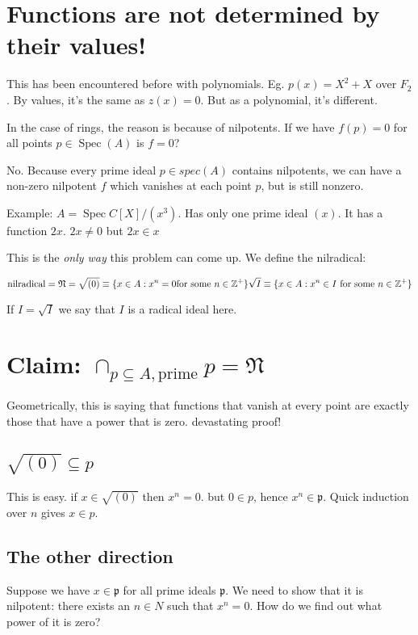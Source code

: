 \documentclass{book}
\newcommand{\Z}{\ensuremath{\mathbb{Z}}}
\newcommand{\spec}{\operatorname{Spec}}
\newcommand{\p}{\mathfrak{p}}
\theoremstyle{definition}
\begin{document}
\section{Functions are not determined by their values!}

This has been encountered before with
polynomials. Eg. $p(x) = X^2 + X$ over $F_2$. By values, it's the same
as $z(x) = 0$. But as a polynomial, it's different.

In the case of rings, the reason is because of nilpotents. If we have
$f(p) = 0$ for all points $p \in \spec(A)$ is $f = 0$? 

No. Because every prime ideal $p \in spec(A)$ contains nilpotents,
we can have a non-zero nilpotent $f$ which vanishes at each point $p$,
but is still nonzero.

Example: $A = \spec C[X]/(x^3)$. Has only one prime ideal $(x)$. It has 
a function $2x$. $2x \neq 0$ but $2x \in x$

This is the \emph{only way} this problem can come up. We define
the nilradical:

$$
\text{nilradical} = \mathfrak N = \sqrt{(0)} \equiv \{ x \in A : x^n = 0 \text{for some } n \in \Z^+ \} \\
\sqrt{I} \equiv \{ x \in A : x^n \in I \text{ for some } n \in \Z^+ \}
$$

If $I = \sqrt{I}$ we say that $I$ is a radical ideal here.


\section{Claim: $\cap_{p \subseteq A, \text{prime}} p = \mathfrak N$}
Geometrically, this is saying that functions that vanish at every point
are exactly those that have a power that is zero.  devastating proof!

\subsection{$\sqrt{(0)} \subseteq p$} This is easy. if $x \in \sqrt{(0)}$
then $x^n = 0$. but $0 \in p$, hence $x^n \in \p$. Quick induction over
$n$ gives $x \in p$.

\subsection{The other direction}
Suppose we have $x \in \p$ for all prime ideals $\p$. We need
to show that it is nilpotent: there exists an $n \in N$ such that $x^n = 0$.
How do we find out what power of it is zero?
\end{document}
